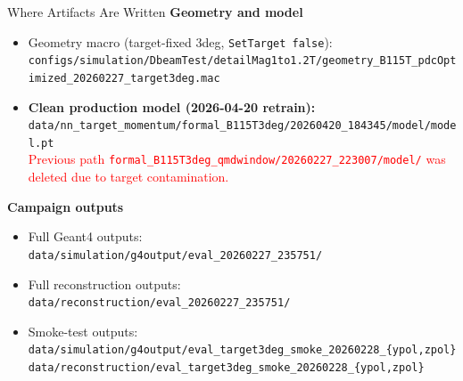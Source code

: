 \documentclass[11pt]{beamer}
\begin{document}
\begin{frame}{Where Artifacts Are Written}
\textbf{Geometry and model}
\begin{itemize}
\item Geometry macro (target-fixed 3deg, \texttt{SetTarget false}):\\
\texttt{configs/simulation/DbeamTest/detailMag1to1.2T/geometry\_B115T\_pdcOptimized\_20260227\_target3deg.mac}
\item \textbf{Clean production model (2026-04-20 retrain):}\\
\texttt{data/nn\_target\_momentum/formal\_B115T3deg/20260420\_184345/model/model.pt}\\
\textcolor{red}{Previous path
\texttt{formal\_B115T3deg\_qmdwindow/20260227\_223007/model/} was deleted
due to target contamination.}
\end{itemize}

\textbf{Campaign outputs}
\begin{itemize}
\item Full Geant4 outputs:\\
\texttt{data/simulation/g4output/eval\_20260227\_235751/}
\item Full reconstruction outputs:\\
\texttt{data/reconstruction/eval\_20260227\_235751/}
\item Smoke-test outputs:\\
\texttt{data/simulation/g4output/eval\_target3deg\_smoke\_20260228\_\{ypol,zpol\}}\\
\texttt{data/reconstruction/eval\_target3deg\_smoke\_20260228\_\{ypol,zpol\}}
\end{itemize}
\end{frame}
\end{document}
